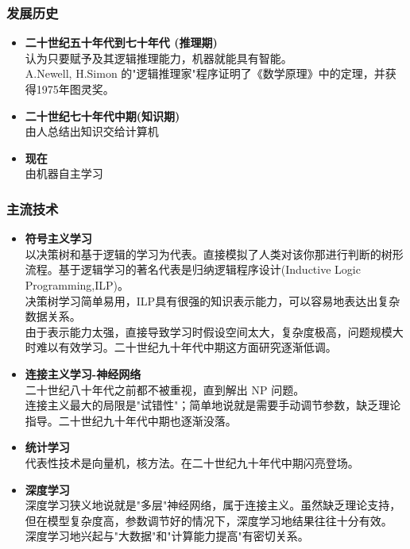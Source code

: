 \subsubsection{发展历史}

\begin{itemize}
    \item \textbf{二十世纪五十年代到七十年代 (推理期)} \\
    认为只要赋予及其逻辑推理能力，机器就能具有智能。\\
    A.Newell, H.Simon 的"逻辑推理家"程序证明了《数学原理》中的定理，并获得1975年图灵奖。
    \item \textbf{二十世纪七十年代中期(知识期)} \\
    由人总结出知识交给计算机
    \item \textbf{现在} \\
    由机器自主学习
\end{itemize}

\subsubsection{主流技术}

\begin{itemize}
    \item \textbf{符号主义学习}\\
    以决策树和基于逻辑的学习为代表。直接模拟了人类对该你那进行判断的树形流程。基于逻辑学习的著名代表是归纳逻辑程序设计(Inductive Logic Programming,ILP)。\\
    决策树学习简单易用，ILP具有很强的知识表示能力，可以容易地表达出复杂数据关系。\\
    由于表示能力太强，直接导致学习时假设空间太大，复杂度极高，问题规模大时难以有效学习。二十世纪九十年代中期这方面研究逐渐低调。

    \item \textbf{连接主义学习-神经网络}\\
    二十世纪八十年代之前都不被重视，直到解出 NP 问题。\\
    连接主义最大的局限是"试错性"；简单地说就是需要手动调节参数，缺乏理论指导。二十世纪九十年代中期也逐渐没落。

    \item \textbf{统计学习} \\
    代表性技术是向量机，核方法。在二十世纪九十年代中期闪亮登场。

    \item \textbf{深度学习} \\
    深度学习狭义地说就是"多层"神经网络，属于连接主义。虽然缺乏理论支持，但在模型复杂度高，参数调节好的情况下，深度学习地结果往往十分有效。\\
    深度学习地兴起与"大数据"和"计算能力提高"有密切关系。\\
\end{itemize}

\newpage